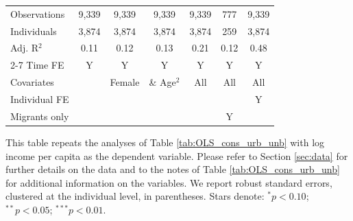 \begin{table}[htbp]
\begin{threeparttable}
\begin{tabular}{l cccccc}
\addlinespace
Observations        &       9,339   &       9,339   &       9,339   &       9,339   &         777   &       9,339   \\
Individuals         &       3,874   &       3,874   &       3,874   &       3,874   &         259   &       3,874   \\
Adj. R$^{2}$        &        0.11   &        0.12   &        0.13   &        0.21   &        0.12   &        0.48   \\
\cmidrule{2-7} Time FE & Y & Y & Y & Y & Y & Y \\ Covariates & & Female & \& Age$^2$ & All & All & All \\ Individual FE & & & & & & Y \\ Migrants only & & & & & Y & \\ \bottomrule \end{tabular} \begin{tablenotes}[flushleft] \footnotesize \item{This table repeats the analyses of Table \ref{tab:OLS_cons_urb_unb} with log income per capita as the dependent variable. Please refer to Section \ref{sec:data} for further details on the data and to the notes of Table \ref{tab:OLS_cons_urb_unb} for additional information on the variables. We report robust standard errors, clustered at the individual level, in parentheses. Stars denote: $^{*} p<0.10$; $^{**} p<0.05$; $^{***} p<0.01$.} \end{tablenotes} \end{threeparttable} \end{table}
